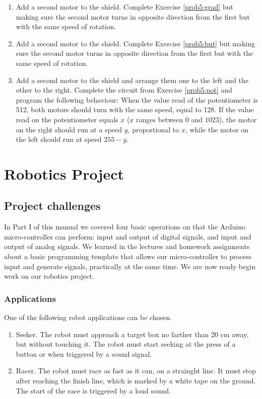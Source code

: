 \documentclass[12pt]{book}
\begin{document}
\begin{enumerate}[1.]
\item\label{ex6:ch5} Add a second motor to the shield. Complete Exercise
  \ref*{prob5:grad} but making sure the second motor turns in opposite
  direction from the first but with the same speed of rotation.

\item Add a second motor to the shield. Complete Exercise
  \ref*{prob5:but} but making sure the second motor turns in opposite
  direction from the first but with the same speed of rotation.

\item Add a second motor to the shield and arrange them one to the
  left and the other to the right. Complete the circuit from Exercise
  \ref*{prob5:pot} and program the following behaviour: When the value
  read of the potentiometer is 512, both motors should turn with the
  same speed, equal to 128. If the value read on the potentiometer
  equals $x$ ($x$ ranges between $0$ and $1023$), the motor on the
  right should run at a speed $y$, proportional to $x$, while the
  motor on the left should run at speed $255-y$.

\end{enumerate}



\part{Robotics Project}

\chapter{Project challenges}\label{challenge:chap}

In Part I of this manual we covered four basic operations on that the
Arduino micro-controller can perform: input and output of digital
signals, and input and output of analog signals. We learned in the
lectures and homework assignments about a basic programming template
that allows our micro-controller to process input and generate
signals, practically at the same time. We are now ready begin work
on our robotics project.

\section{Applications}

One of the following robot applications can be chosen. 
\begin{enumerate}[{A}1:]
\item\label{app.seek} Seeker. The robot must approach a
target box no farther than 20 cm away, but without touching
it. The robot must start seeking at the press of a button or when triggered by a sound signal.
\item\label{app.race} Racer. The robot must race as fast as it can, on a strainght line. It must stop after reaching the finish line, which is marked by a white tape on the ground.  The start of the race is triggered by a loud sound.
\end{enumerate}
\end{document}
